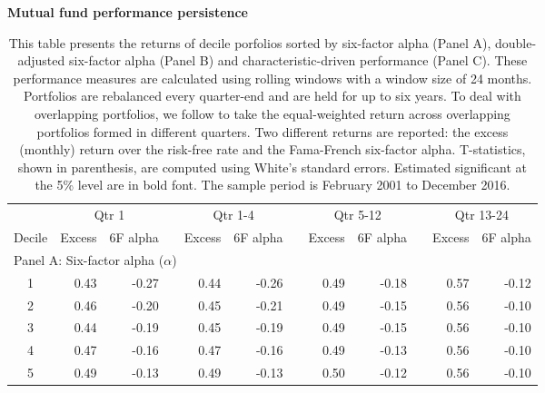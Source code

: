 \begin{singlespacing}
\begin{table}[H]
\small
\centering
{\captionsetup{justification=centering,singlelinecheck=off}
\caption{ \bfseries Mutual fund performance persistence} \label{table6} }
\caption*{This table presents the returns of decile porfolios sorted by six-factor alpha (Panel A), double-adjusted six-factor alpha (Panel B) and characteristic-driven performance (Panel C). These performance measures are calculated using rolling windows with a window size of 24 months. Portfolios are rebalanced every quarter-end and are held for up to six years. To deal with overlapping portfolios, we follow \citet{jegadeesh1993returns} to take the equal-weighted return across overlapping portfolios formed in different quarters. Two different returns are reported: the excess (monthly) return over the risk-free rate and the Fama-French six-factor alpha. T-statistics, shown in parenthesis, are computed using White's standard errors. Estimated significant at the 5\% level are in bold font. The sample period is February 2001 to December 2016.}
\label{my-label}
\begin{tabular}{crrrrrrrrrrr}
\hline
      & \multicolumn{2}{c}{Qtr 1}         &  & \multicolumn{2}{c}{Qtr 1-4}       &  & \multicolumn{2}{c}{Qtr 5-12} &  & \multicolumn{2}{c}{Qtr 13-24} \\ \cline{2-3} \cline{5-6} \cline{8-9} \cline{11-12} 
Decile & Excess          & 6F alpha        &  & Excess          & 6F alpha        &  & Excess   & 6F alpha          &  & Excess    & 6F alpha          \\ \cline{1-3} \cline{5-12} 
\multicolumn{12}{l}{Panel A: Six-factor alpha ($\alpha$)}                                                                                                         \\
1    & 0.43   & -0.27         &  & 0.44   & -0.26         &  & 0.49   & -0.18         &  & 0.57 & -0.12  \\
2    & 0.46   & -0.20         &  & 0.45   & -0.21         &  & 0.49   & -0.15         &  & 0.56 & -0.10  \\
3    & 0.44   & -0.19         &  & 0.45   & -0.19         &  & 0.49   & -0.15         &  & 0.56 & -0.10  \\
4    & 0.47   & -0.16         &  & 0.47   & -0.16         &  & 0.49   & -0.13         &  & 0.56 & -0.10  \\
5    & 0.49   & -0.13         &  & 0.49   & -0.13         &  & 0.50   & -0.12         &  & 0.56 & -0.10  \\

\end{tabular}
\end{table}
\end{singlespacing}
